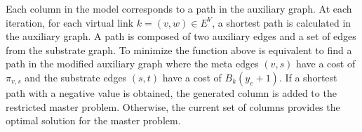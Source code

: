 \documentclass{llncs}
\begin{document}
Each column in the model corresponds to a path in the auxiliary graph. At each iteration, for each virtual link $k = (v,w) \in E^V$, a shortest path is calculated in the auxiliary graph. A path is composed of two auxiliary edges and a set of edges from the substrate graph. To minimize the function above is equivalent to find a path in the modified auxiliary graph where the meta edges $(v,s)$ have a cost of $\pi_{v,s}$ and the substrate edges $(s,t)$ have a cost of $B_{k}(y_{e} + 1)$. If a shortest path with a negative value is obtained, the generated column is added to the restricted master problem. Otherwise, the current set of columns provides the optimal solution for the master problem.

\end{document}

